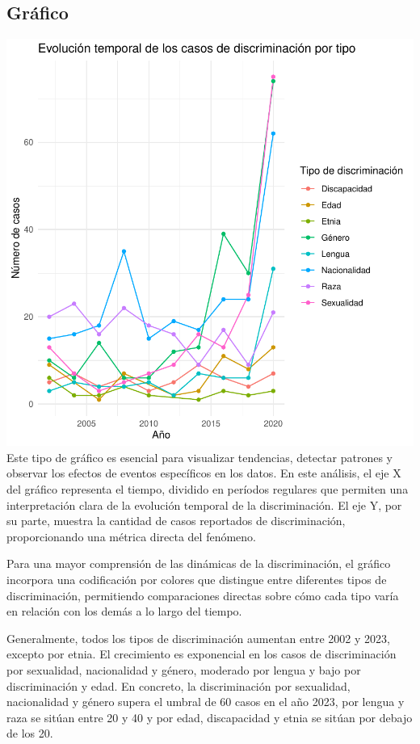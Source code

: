 \documentclass{article}
\begin{document}
\subsection{Gráfico}
\includegraphics{Informetecnico-002}
Este tipo de gráfico es esencial para visualizar tendencias, detectar patrones y observar los efectos de eventos específicos en los datos. En este análisis, el eje X del gráfico representa el tiempo, dividido en períodos regulares que permiten una interpretación clara de la evolución temporal de la discriminación. El eje Y, por su parte, muestra la cantidad de casos reportados de discriminación, proporcionando una métrica directa del fenómeno.

Para una mayor comprensión de las dinámicas de la discriminación, el gráfico incorpora una codificación por colores que distingue entre diferentes tipos de discriminación, permitiendo comparaciones directas sobre cómo cada tipo varía en relación con los demás a lo largo del tiempo.

Generalmente, todos los tipos de discriminación aumentan entre 2002 y 2023, excepto por etnia. El crecimiento es exponencial en los casos de discriminación por sexualidad, nacionalidad y género, moderado por lengua y bajo por discriminación y edad. En concreto, la discriminación por sexualidad, nacionalidad y género supera el umbral de 60 casos en el año 2023, por lengua y raza se sitúan entre 20 y 40 y por edad, discapacidad y etnia se sitúan por debajo de los 20. 
\end{document}
